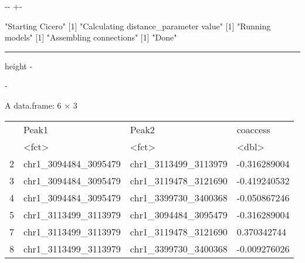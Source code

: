 \documentclass[letterpaper,10pt,english]{sphinxmanual}
\makeatletter
\newenvironment{nbsphinxfancyoutput}{%
    \let\sphinxincludegraphics\nbsphinxincludegraphics
    \nbsphinx@image@maxheight\textheight
    \advance\nbsphinx@image@maxheight -2\fboxsep   %
    \advance\nbsphinx@image@maxheight -2\fboxrule  %
    \advance\nbsphinx@image@maxheight -\baselineskip
\def\nbsphinxfcolorbox{\spx@fcolorbox{nbsphinx-code-border}{white}}%
\def\FrameCommand{\nbsphinxfcolorbox\nbsphinxfancyaddprompt\@empty}%
\def\FirstFrameCommand{\nbsphinxfcolorbox\nbsphinxfancyaddprompt\sphinxVerbatim@Continues}%
\def\MidFrameCommand{\nbsphinxfcolorbox\sphinxVerbatim@Continued\sphinxVerbatim@Continues}%
\def\LastFrameCommand{\nbsphinxfcolorbox\sphinxVerbatim@Continued\@empty}%
\MakeFramed{\advance\hsize-\width\@totalleftmargin\z@\linewidth\hsize\@setminipage}%
}{\par\unskip\@minipagefalse\endMakeFramed}
\def\nbsphinxfancyaddprompt{\ifvoid\nbsphinxpromptbox\else
    \kern\fboxrule\kern\fboxsep
    \copy\nbsphinxpromptbox
    \kern-\ht\nbsphinxpromptbox\kern-\dp\nbsphinxpromptbox
    \kern-\fboxsep\kern-\fboxrule\nointerlineskip
    \fi}
\newlength\nbsphinxcodecellspacing
\newcommand*{\nbsphinxincludegraphics}[2][]{%
    \gdef\spx@includegraphics@options{#1}%
    \setbox\spx@image@box\hbox{\texttt{[image: \#2]}}%
    \in@false
    \ifdim \wd\spx@image@box>\linewidth
      \g@addto@macro\spx@includegraphics@options{,width=\linewidth}%
      \in@true
    \fi
    \ifdim \ht\spx@image@box>\nbsphinx@image@maxheight
      \g@addto@macro\spx@includegraphics@options{,height=\nbsphinx@image@maxheight}%
      \in@true
    \fi
    \ifin@
      \g@addto@macro\spx@includegraphics@options{,keepaspectratio}%
    \fi
    \setbox\spx@image@box\box\voidb@x %
    \expandafter\includegraphics\expandafter[\spx@includegraphics@options]{#2}%
}%
\makeatother
\begin{document}
%
{
\kern-\sphinxverbatimsmallskipamount\kern-\baselineskip
\kern+\FrameHeightAdjust\kern-\fboxrule
\vspace{\nbsphinxcodecellspacing}
%
\begin{sphinxVerbatim}[commandchars=\\\{\}]
[1] "Starting Cicero"
[1] "Calculating distance\_parameter value"
[1] "Running models"
[1] "Assembling connections"
[1] "Done"
\end{sphinxVerbatim}
}
\relax

\hrule height -\fboxrule\relax
\vspace{\nbsphinxcodecellspacing}

\makeatletter\setbox\nbsphinxpromptbox\box\voidb@x\makeatother

\begin{nbsphinxfancyoutput}
A data.frame: 6 × 3
\begin{tabular}{r|lll}
  & Peak1 & Peak2 & coaccess\\
  & <fct> & <fct> & <dbl>\\
\hline
    2 & chr1\_3094484\_3095479 & chr1\_3113499\_3113979 & -0.316289004\\
    3 & chr1\_3094484\_3095479 & chr1\_3119478\_3121690 & -0.419240532\\
    4 & chr1\_3094484\_3095479 & chr1\_3399730\_3400368 & -0.050867246\\
    5 & chr1\_3113499\_3113979 & chr1\_3094484\_3095479 & -0.316289004\\
    7 & chr1\_3113499\_3113979 & chr1\_3119478\_3121690 &  0.370342744\\
    8 & chr1\_3113499\_3113979 & chr1\_3399730\_3400368 & -0.009276026\\
\end{tabular}
\end{nbsphinxfancyoutput}
\end{document}
